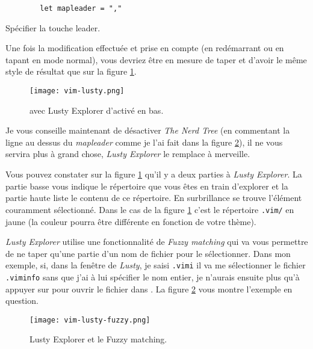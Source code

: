 \begin{listing}[H]

    \begin{verbatim}
        let mapleader = ","
    \end{verbatim}
    \caption{Spécifier la touche leader.}
    \label{code:leader}
\end{listing}

Une fois la modification effectuée et prise en compte (en redémarrant \vim ou en tapant  en mode normal), vous devriez être en mesure de taper  et d'avoir le même style de résultat que sur la figure \ref{fig:vim-lusty}.

\begin{figure}%
  \texttt{[image: vim-lusty.png]}
  \caption{\vim avec Lusty Explorer d'activé en bas.}
  \label{fig:vim-lusty}
\end{figure}

Je vous conseille maintenant de désactiver \emph{The Nerd Tree} (en commentant la ligne au dessus du \emph{mapleader} comme je l'ai fait dans la figure \ref{fig:vim-lusty-fuzzy}), il ne vous servira plus à grand chose, \emph{Lusty Explorer} le remplace à merveille.

Vous pouvez constater sur la figure \ref{fig:vim-lusty} qu'il y a deux parties à \emph{Lusty Explorer}. La partie basse vous indique le répertoire que vous êtes en train d'explorer et la partie haute liste le contenu de ce répertoire. En surbrillance se trouve l'élément couramment sélectionné. Dans le cas de la figure \ref{fig:vim-lusty} c'est le répertoire \Verb|.vim/| en jaune  (la couleur pourra être différente en fonction de votre thème).

\emph{Lusty Explorer} utilise une fonctionnalité de \emph{Fuzzy matching} qui va vous permettre de ne taper qu'une partie d'un nom de fichier pour le sélectionner. Dans mon exemple, si, dans la fenêtre de \emph{Lusty}, je saisi \Verb|.vimi| il va me sélectionner le fichier \Verb|.viminfo| sans que j'ai à lui spécifier le nom entier, je n'aurais ensuite plus qu'à appuyer sur \ttenter pour ouvrir le fichier dans \vim. La figure \ref{fig:vim-lusty-fuzzy} vous montre l'exemple en question.

\begin{figure}%
  \texttt{[image: vim-lusty-fuzzy.png]}
  \caption{Lusty Explorer et le Fuzzy matching.}
  \label{fig:vim-lusty-fuzzy}
\end{figure}

